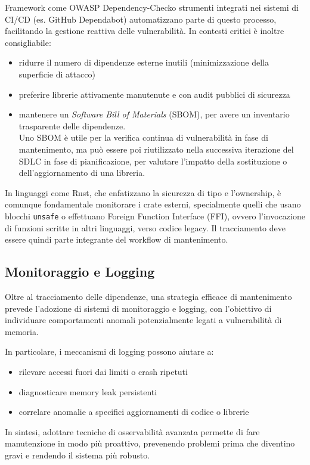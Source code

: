 Framework come OWASP Dependency-Check\footnotemark o strumenti integrati nei sistemi
di CI/CD (es. GitHub Dependabot) automatizzano parte di questo processo, facilitando
la gestione reattiva delle vulnerabilità. In contesti critici è inoltre
consigliabile: 
\begin{itemize}
  \item ridurre il numero di dipendenze esterne inutili (minimizzazione della
    superficie di attacco)

  \item preferire librerie attivamente manutenute e con audit pubblici di sicurezza

  \item mantenere un \textit{Software Bill of Materials} (SBOM), per avere un inventario
    trasparente delle dipendenze. \\ Uno SBOM è utile per la verifica continua
    di vulnerabilità in fase di mantenimento, ma può essere poi riutilizzato nella
    successiva iterazione del SDLC in fase di pianificazione, per valutare l'impatto
    della sostituzione o dell'aggiornamento di una libreria.
\end{itemize}

In linguaggi come Rust, che enfatizzano la sicurezza di tipo e l'ownership, è
comunque fondamentale monitorare i crate esterni, specialmente quelli che usano blocchi
\texttt{unsafe} o effettuano Foreign Function Interface (FFI), ovvero l'invocazione
di funzioni scritte in altri linguaggi, verso codice legacy. Il tracciamento deve
essere quindi parte integrante del workflow di mantenimento.

\subsection{Monitoraggio e Logging}
\label{sec:monitoraggio-logging}

Oltre al tracciamento delle dipendenze, una strategia efficace di mantenimento prevede
l'adozione di sistemi di monitoraggio e logging, con l'obiettivo di individuare
comportamenti anomali potenzialmente legati a vulnerabilità di memoria.

In particolare, i meccanismi di logging possono aiutare a:
\begin{itemize}
  \item rilevare accessi fuori dai limiti o crash ripetuti

  \item diagnosticare memory leak persistenti

  \item correlare anomalie a specifici aggiornamenti di codice o librerie
\end{itemize}

In sintesi, adottare tecniche di osservabilità avanzata permette di fare
manutenzione in modo più proattivo, prevenendo problemi prima che diventino gravi
e rendendo il sistema più robusto.